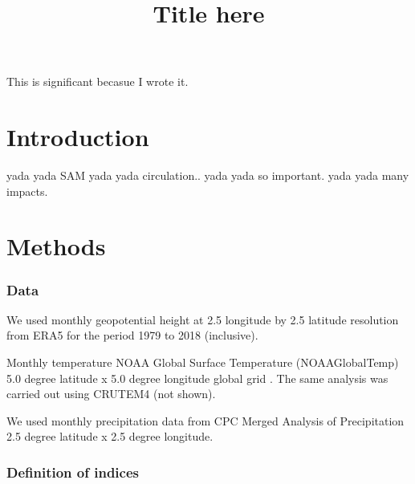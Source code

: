\documentclass[]{ametsocV5}
\title{Title here}
\affiliation{CIMA UBA blablabla}
\begin{document}
\maketitle


%
%
\statement
This is significant becasue I wrote it.



%

\section{Introduction}

yada yada SAM yada yada circulation.. yada yada so important. yada yada
many impacts.

\section{Methods}

\subsubsection{Data}

We used monthly geopotential height at 2.5 longitude by 2.5 latitude
resolution from ERA5 \citep{hersbach} for the period 1979 to 2018
(inclusive).

Monthly temperature NOAA Global Surface Temperature (NOAAGlobalTemp) 5.0
degree latitude x 5.0 degree longitude global grid
\citep{vose2012, smith2008}. The same analysis was carried out using
CRUTEM4 \citep{osborn2014} (not shown).

We used monthly precipitation data from CPC Merged Analysis of
Precipitation \citep{xie1997} 2.5 degree latitude x 2.5 degree
longitude.

\subsubsection{Definition of indices}
\end{document}
